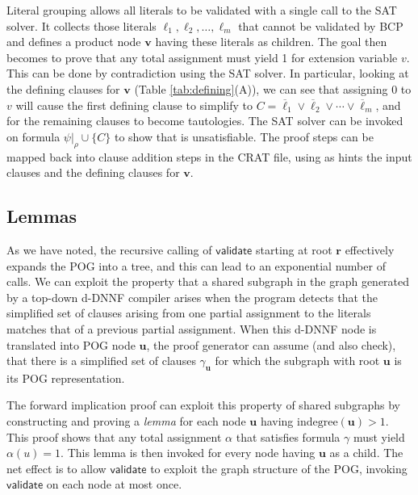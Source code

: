 \documentclass[letterpaper,USenglish,cleveref, autoref, thm-restate]{lipics-v2021}
\newcommand{\obar}[1]{\overline{#1}}
\newcommand{\lit}{\ell}
\newcommand{\assign}{\alpha}
\newcommand{\passign}{\rho}
\newcommand{\indegree}{\textrm{indegree}}
\newcommand{\validate}{\textsf{validate}}
\newcommand{\makenode}[1]{\mathbf{#1}}
\newcommand{\nodeu}{\makenode{u}}
\newcommand{\nodev}{\makenode{v}}
\newcommand{\noder}{\makenode{r}}
\newcommand{\simplify}[2]{#1|_{#2}}
\begin{document}
Literal grouping allows all literals to be validated with a single call to the SAT solver.
It collects those literals
$\lit_1, \lit_2, \ldots, \lit_m$ that cannot be validated by BCP and defines a
product node $\nodev$ having these literals as children.  The goal
then becomes to prove that any total assignment must yield 1 for extension
variable $v$.  This can be done by contradiction using the SAT solver.
In particular, looking at the defining clauses for $\nodev$ (Table
\ref{tab:defining}(A)), we can see that assigning 0 to $v$ will cause
the first defining clause to simplify to
$C = \obar{\lit}_1 \lor  \obar{\lit}_2 \lor \cdots \lor \obar{\lit}_m$, and for the remaining
  clauses to become tautologies.  The SAT solver can be invoked on formula
  $\simplify{\psi}{\passign} \cup \{ C \}$ to show that is unsatisfiable.
  The proof steps can be mapped back into clause addition steps in the CRAT file, using as hints the
  input clauses and the defining clauses for $\nodev$.


\subsection{Lemmas}
\label{sect:lemma}

As we have noted, the recursive calling of $\validate$ starting at
root $\noder$ effectively expands the POG into a tree, and this can
lead to an exponential number of calls.  We can exploit the property
that a shared subgraph in the graph generated by a top-down d-DNNF
compiler arises when the program detects that the simplified set of
clauses arising from one partial assignment to the literals matches that
of a previous partial assignment.  When this d-DNNF node is translated into POG
node $\nodeu$, the proof generator can assume (and also check), that
there is a simplified set of clauses $\gamma_{\nodeu}$
for which the subgraph with root $\nodeu$ is its POG representation.

The forward implication proof can exploit this property of shared
subgraphs by constructing and proving a {\em lemma} for each node
$\nodeu$ having $\indegree(\nodeu) > 1$.  This proof shows that any
total assignment $\assign$ that satisfies formula $\gamma$ must yield
$\assign(u) = 1$.  This lemma is then invoked for every node having
$\nodeu$ as a child.  The net effect is to allow $\validate$ to
exploit the graph structure of the POG, invoking $\validate$ on each
node at most once.
\end{document}
